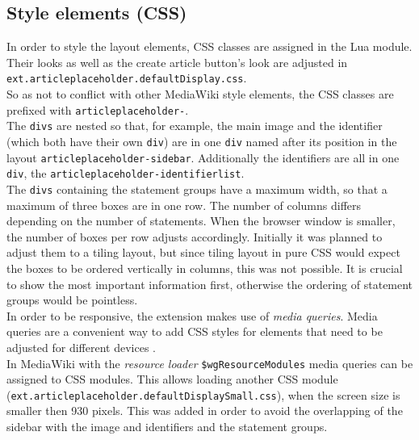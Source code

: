\subsection{Style elements (CSS)}

In order to style the layout elements, CSS classes are assigned in the Lua module. Their looks as well as the create article button's look are adjusted in \texttt{ext.articleplaceholder.defaultDisplay.css}. \\
So as not to conflict with other MediaWiki style elements, the CSS classes are prefixed with \texttt{\justify articleplaceholder-}. \\
The \texttt{\justify divs} are nested so that, for example, the main image and the identifier (which both have their own \texttt{div}) are in one \texttt{div} named after its position in the layout \texttt{\justify articleplaceholder-sidebar}. Additionally the identifiers are all in one \texttt{div}, the \texttt{\justify articleplaceholder-identifierlist}. \\
The \texttt{divs} containing the statement groups have a maximum width, so that a maximum of three boxes are in one row. The number of columns differs depending on the number of statements. When the browser window is smaller, the number of boxes per row adjusts accordingly. Initially it was planned to adjust them to a tiling layout, but since tiling layout in pure CSS would expect the boxes to be ordered vertically in columns, this was not possible. It is crucial to show the most important information first, otherwise the ordering of statement groups would be pointless. \\
In order to be responsive, the extension makes use of \textit{media queries}. Media queries are a convenient way to add CSS styles for elements that need to be adjusted for different devices \citep[43]{mediaquery}.\\
In MediaWiki with the \textit{resource loader} \texttt{\justify \$wgResourceModules} media queries can be assigned to CSS modules. This allows loading another CSS module (\texttt{\justify ext.articleplaceholder.defaultDisplaySmall.css}), when the screen size is smaller then 930 pixels. This was added in order to avoid the overlapping of the sidebar with the image and identifiers and the statement groups.